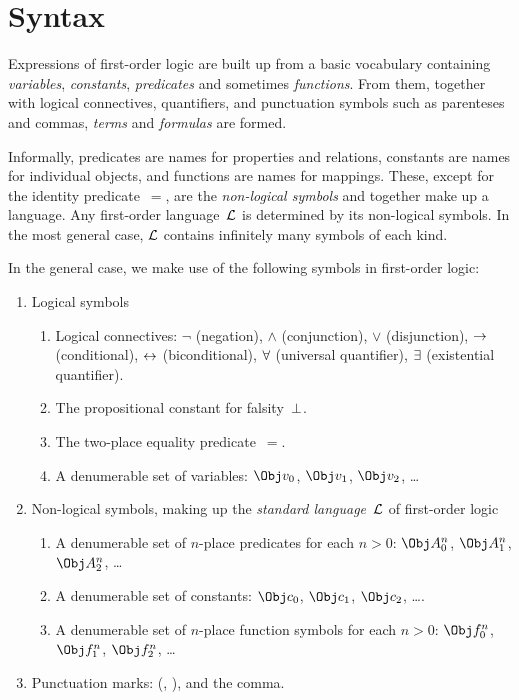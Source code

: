 \documentclass[syntax-and-semantics]{subfiles}
\begin{document}
\section{Syntax}

\begin{wordy}
Expressions of first-order logic are built up from a basic vocabulary
containing \emph{variables}, \emph{constants}, \emph{predicates} and
sometimes \emph{functions}.  From them, together with logical
connectives, quantifiers, and punctuation symbols such as parenteses
and commas, \emph{terms} and \emph{formulas} are formed.  

Informally, predicates are names for properties and relations,
constants are names for individual objects, and functions are names
for mappings.  These, except for the identity predicate~$=$, are the
\emph{non-logical symbols} and together make up a language.  Any
first-order language~$\mathcal L$ is determined by its non-logical
symbols.  In the most general case, $\mathcal L$ contains infinitely
many symbols of each kind.
\end{wordy}

In the general case, we make use of the following symbols in
first-order logic:

\begin{enumerate}
\item Logical symbols
\begin{enumerate}
\item Logical connectives: $\lnot$ (negation), $\land$ (conjunction),
  $\lor$ (disjunction), $\to$ (conditional), $\leftrightarrow$ (biconditional),
  $\lforall$ (universal quantifier), $\lexists$ (existential
  quantifier).
\item The propositional constant for falsity~$\bot$.
\item The two-place equality predicate~$=$.
\item A denumerable set of variables: $\Obj v_0$, $\Obj v_1$, $\Obj
  v_2$, \dots
\end{enumerate}
\item Non-logical symbols, making up the \emph{standard
  language}~$\mathcal L$ of first-order logic
\begin{enumerate}
\item A denumerable set of $n$-place predicates for each $n>0$: $\Obj
  A^n_0$, $\Obj A^n_1$, $\Obj A^n_2$, \dots
\item A denumerable set of constants: $\Obj c_0$, $\Obj c_1$, $\Obj
  c_2$, \dots.
\item A denumerable set of $n$-place function symbols for each $n>0$:
  $\Obj f^n_0$, $\Obj f^n_1$, $\Obj f^n_2$, \dots
\end{enumerate}
\item Punctuation marks: (, ), and the comma.
\end{enumerate}
\end{document}
